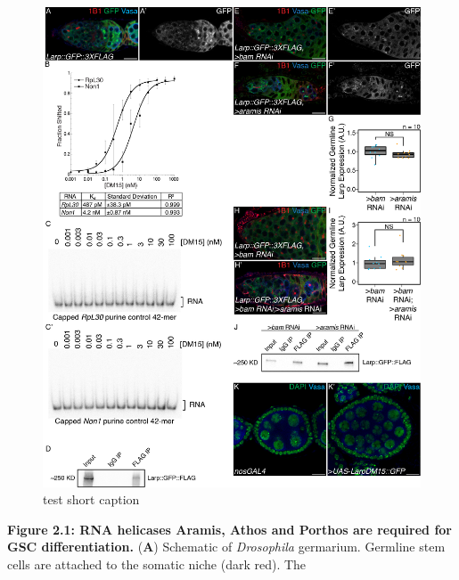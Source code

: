 \documentclass[12pt,oneside]{reedthesis}
\begin{document}
\begin{figure}

{\centering \includegraphics[width=6.5 in,height=8.9375 in]{./figure/Ribosome Biogenesis/Ribosome Biogenesis 7S} 

}

\caption[test short caption]{test short caption}\label{fig:unnamed-chunk-19}
\end{figure}
\textbf{Figure 2.1: RNA helicases Aramis, Athos and Porthos are required for GSC differentiation.}
(\textbf{A}) Schematic of \emph{Drosophila} germarium.
Germline stem cells are attached to the somatic niche (dark red). The
\end{document}
